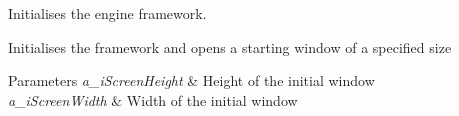 Initialises the engine framework. 

Initialises the framework and opens a starting window of a specified size


\begin{DoxyParams}{Parameters}
{\em a\-\_\-i\-Screen\-Height} & Height of the initial window \\
\hline
{\em a\-\_\-i\-Screen\-Width} & Width of the initial window \\
\hline
\end{DoxyParams}
